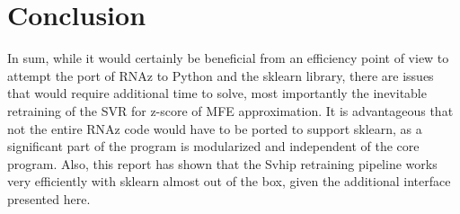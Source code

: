 \documentclass[]{article}
\begin{document}
\section{Conclusion}

In sum, while it would certainly be beneficial from an efficiency point of view to attempt the port of RNAz to Python and the sklearn library, there are issues that would require additional time to solve, most importantly the inevitable retraining of the SVR for z-score of MFE approximation. It is advantageous that not the entire RNAz code would have to be ported to support sklearn, as a significant part of the program is modularized and independent of the core program. Also, this report has shown that the Svhip retraining pipeline works very efficiently with sklearn almost out of the box, given the additional interface presented here.  
\end{document}
